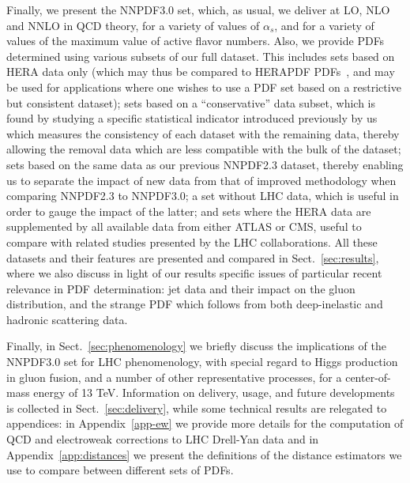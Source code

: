 Finally, we present the NNPDF3.0 set, which, as usual, we deliver
at LO, NLO and NNLO in QCD theory, for a variety of values of
$\alpha_s$, and  for a variety of values of the maximum value of
active flavor numbers. Also, we provide PDFs determined using   various subsets
of our full dataset. This includes sets based on HERA data only (which
may thus be compared to HERAPDF PDFs~\cite{Radescu:2010zz,CooperSarkar:2011aa},
 and may be used
for applications where one wishes to use a PDF set based on a
restrictive but consistent dataset); sets based on a ``conservative''
data subset, which is found by studying a specific statistical
indicator introduced previously by us~\cite{Ball:2010gb} which
measures the consistency of each dataset with the remaining data,
thereby allowing the removal data which are less compatible with the
bulk of the dataset; sets based on the same data as our previous
NNPDF2.3 dataset, thereby enabling us to separate the impact of new
data from that of improved methodology when comparing NNPDF2.3 to
NNPDF3.0; a set without LHC data, which is useful in order to
gauge the impact of the latter; and sets
where the HERA data are supplemented by
all available data from either ATLAS or CMS,
useful to compare with related studies presented by the LHC
collaborations.
%
 All these datasets and their features
are presented and compared in
Sect.~\ref{sec:results}, where we also discuss in light of our
results  specific issues of particular recent relevance in PDF
determination: jet data and their impact on the gluon distribution,
and the strange PDF which follows from both deep-inelastic and hadronic
scattering data.

Finally, in  Sect.~\ref{sec:phenomenology} we briefly discuss the 
implications of the NNPDF3.0 set for LHC
phenomenology, with special regard to Higgs production in gluon fusion, and 
a number of other representative processes, for
a center-of-mass energy of  13 TeV. 
%
Information 
on delivery, usage, and future developments is collected in
Sect.~\ref{sec:delivery}, while some technical results are relegated to 
appendices: in Appendix~\ref{app-ew}
we provide more details for the computation of QCD and electroweak corrections
to LHC Drell-Yan data and in Appendix~\ref{app:distances} we present
the definitions of the distance estimators we use 
to compare between different sets
of PDFs.
